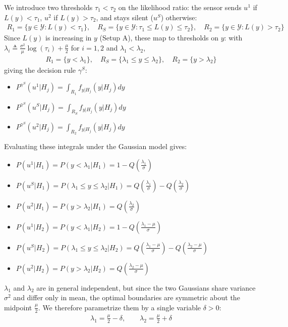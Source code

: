 \documentclass[11pt]{article}
\begin{document}
We introduce two thresholds $\tau_1 < \tau_2$ on the likelihood ratio: the sensor sends $u^1$ if $L(y) < \tau_1$, $u^2$ if $L(y) > \tau_2$, and stays silent ($u^S$) otherwise:
\begin{align*}
    R_1 = \{y \in \mathcal{Y}: L(y) < \tau_1\}, \quad R_S = \{y \in \mathcal{Y}: \tau_1 \leq L(y) \leq \tau_2\}, \quad R_2 = \{y \in \mathcal{Y}: L(y) > \tau_2\}
\end{align*}
Since $L(y)$ is increasing in $y$ (Setup A), these map to thresholds on $y$: with $\lambda_i \triangleq \frac{\sigma^2}{\mu}\log(\tau_i) + \frac{\mu}{2}$ for $i=1,2$ and $\lambda_1 < \lambda_2$,
\begin{align*}
    R_1 = \{y < \lambda_1\}, \quad R_S = \{\lambda_1 \leq y \leq \lambda_2\}, \quad R_2 = \{y > \lambda_2\}
\end{align*}
giving the decision rule $\gamma^S$:
\begin{itemize}
    \item $P^{\gamma^S}(u^1|H_j) = \int_{R_1}f_{y|H_j}(y|H_j)dy$
    \item $P^{\gamma^S}(u^S|H_j) = \int_{R_S}f_{y|H_j}(y|H_j)dy$
    \item $P^{\gamma^S}(u^2|H_j) = \int_{R_2}f_{y|H_j}(y|H_j)dy$
\end{itemize}
Evaluating these integrals under the Gaussian model gives:
\begin{itemize}
    \item $P(u^1|H_1) = P(y<\lambda_1|H_1) = 1-Q(\frac{\lambda_1}{\sigma})$
    \item $P(u^S|H_1) = P(\lambda_1\leq y\leq\lambda_2|H_1) = Q(\frac{\lambda_1}{\sigma}) - Q(\frac{\lambda_2}{\sigma})$
    \item $P(u^2|H_1) = P(y>\lambda_2|H_1) = Q(\frac{\lambda_2}{\sigma})$
    \item $P(u^1|H_2) = P(y<\lambda_1|H_2) = 1-Q(\frac{\lambda_1-\mu}{\sigma})$
    \item $P(u^S|H_2) = P(\lambda_1\leq y\leq\lambda_2|H_2) = Q(\frac{\lambda_1-\mu}{\sigma}) - Q(\frac{\lambda_2-\mu}{\sigma})$
    \item $P(u^2|H_2) = P(y>\lambda_2|H_2) = Q(\frac{\lambda_2-\mu}{\sigma})$
\end{itemize}
$\lambda_1$ and $\lambda_2$ are in general independent, but since the two Gaussians share variance $\sigma^2$ and differ only in mean, the optimal boundaries are symmetric about the midpoint $\frac{\mu}{2}$. We therefore parametrize them by a single variable $\delta > 0$:
\begin{align*}
    \lambda_1 = \frac{\mu}{2} - \delta, \qquad \lambda_2 = \frac{\mu}{2} + \delta
\end{align*}
\end{document}
